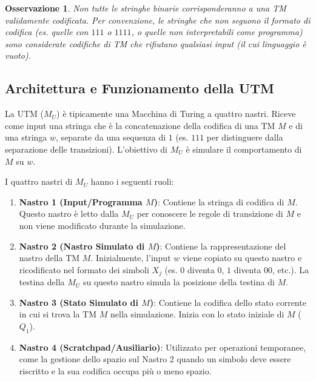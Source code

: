 \documentclass[a4paper]{article}
\newtheorem{remark}{Osservazione}
\begin{document}
\begin{remark}
Non tutte le stringhe binarie corrisponderanno a una TM validamente codificata. Per convenzione, le stringhe che non seguono il formato di codifica (es. quelle con $111$ o $1111$, o quelle non interpretabili come programma) sono considerate codifiche di TM che rifiutano qualsiasi input (il cui linguaggio è vuoto).
\end{remark}

\subsection{Architettura e Funzionamento della UTM}

La UTM ($M_U$) è tipicamente una Macchina di Turing a quattro nastri. Riceve come input una stringa che è la concatenazione della codifica di una TM $M$ e di una stringa $w$, separate da una sequenza di $1$ (es. $111$ per distinguere dalla separazione delle transizioni). L'obiettivo di $M_U$ è simulare il comportamento di $M$ su $w$.

I quattro nastri di $M_U$ hanno i seguenti ruoli:
\begin{enumerate}
    \item \textbf{Nastro 1 (Input/Programma $M$)}: Contiene la stringa di codifica di $M$. Questo nastro è letto dalla $M_U$ per conoscere le regole di transizione di $M$ e non viene modificato durante la simulazione.
    \item \textbf{Nastro 2 (Nastro Simulato di $M$)}: Contiene la rappresentazione del nastro della TM $M$. Inizialmente, l'input $w$ viene copiato su questo nastro e ricodificato nel formato dei simboli $X_j$ (es. $0$ diventa $0$, $1$ diventa $00$, etc.). La testina della $M_U$ su questo nastro simula la posizione della testina di $M$.
    \item \textbf{Nastro 3 (Stato Simulato di $M$)}: Contiene la codifica dello stato corrente in cui si trova la TM $M$ nella simulazione. Inizia con lo stato iniziale di $M$ ($Q_1$).
    \item \textbf{Nastro 4 (Scratchpad/Ausiliario)}: Utilizzato per operazioni temporanee, come la gestione dello spazio sul Nastro 2 quando un simbolo deve essere riscritto e la sua codifica occupa più o meno spazio.
\end{enumerate}
\end{document}
